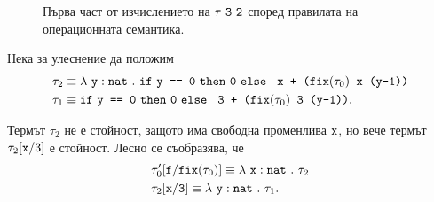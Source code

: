 \begin{landscape}
\begin{framed}
  \begin{figure}[H]
    \begin{prooftree}
    \end{prooftree}
    \caption{Първа част от изчислението на $\tau\ \vv{3}\ \vv{2}$ според правилата на операционната семантика.}
  \end{figure}
\end{framed}

Нека за улеснение да положим
\begin{align*}
  \tau_2 & \equiv \lamb{y}{nat}{\ifelse{\vv{y == 0}}{\vv{0}}{\vv{ x + (}\fix(\tau_0)\vv{ x (y-1))}}}\\
  \tau_1 & \equiv \ifelse{\vv{y == 0}}{\vv{0}}{\vv{ 3 + (}\fix(\tau_0)\vv{ 3 (y-1))}}.
\end{align*}

Термът $\tau_2$ не е стойност, защото има свободна променлива $\vv{x}$, но вече термът $\tau_2\subst{x}{3}$ е стойност. Лесно се съобразява, че
\begin{align*}
  & \tau'_0\subst{f}{\fix(\tau_0)} \equiv \lamb{x}{nat}{\tau_2}\\
  & \tau_2 \substConst{x}{3} \equiv \lamb{y}{nat}{\tau_1}.
\end{align*}




\end{landscape}
